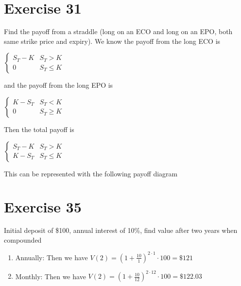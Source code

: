 \documentclass{article}
\begin{document}
\section*{Exercise 31}
\begin{flushleft}
Find the payoff from a straddle (long on an ECO and long on an EPO, both same strike price and expiry).
We know the payoff from the long ECO is 
\begin{center}
    $\begin{cases}
        S_T - K & S_T > K \\
        0 & S_T \leq K
    \end{cases}$
\end{center}
and the payoff from the long EPO is
\begin{center}
    $\begin{cases}
        K-S_T & S_T < K \\
        0 & S_T \geq K
    \end{cases}$
\end{center}
Then the total payoff is
\begin{center}
    $\begin{cases}
        S_T - K & S_T > K \\
        K - S_T & S_T \leq K
    \end{cases}$
\end{center}
This can be represented with the following payoff diagram
\begin{center}
\end{center}
\end{flushleft}
\break
\section*{Exercise 35}
Initial deposit of \$100, annual interest of 10\%, find value after two years when compounded
\begin{enumerate}
    \item Annually: Then we have $V(2) = (1 + \frac{10}{1})^{2\cdot1} \cdot 100 = \$121$
    \item Monthly: Then we have $V(2) = (1 + \frac{10}{12})^{2\cdot12} \cdot 100 = \$122.03$
\end{enumerate}
\end{document}
